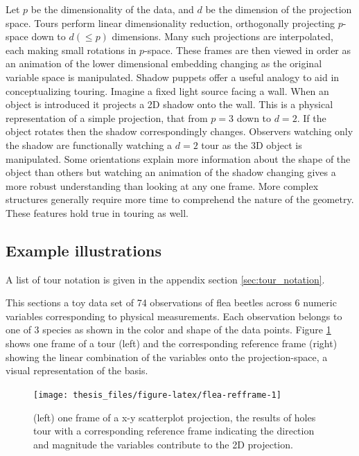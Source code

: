 \documentclass{monashthesis}
\begin{document}
Let \(p\) be the dimensionality of the data, and \(d\) be the dimension
of the projection space. Tours perform linear dimensionality reduction,
orthogonally projecting \(p\)-space down to \(d(\leq p)\) dimensions.
Many such projections are interpolated, each making small rotations in
\(p\)-space. These frames are then viewed in order as an animation of
the lower dimensional embedding changing as the original variable space
is manipulated. Shadow puppets offer a useful analogy to aid in
conceptualizing touring. Imagine a fixed light source facing a wall.
When an object is introduced it projects a 2D shadow onto the wall. This
is a physical representation of a simple projection, that from \(p=3\)
down to \(d=2\). If the object rotates then the shadow correspondingly
changes. Observers watching only the shadow are functionally watching a
\(d=2\) tour as the 3D object is manipulated. Some orientations explain
more information about the shape of the object than others but watching
an animation of the shadow changing gives a more robust understanding
than looking at any one frame. More complex structures generally require
more time to comprehend the nature of the geometry. These features hold
true in touring as well.

\subsection{Example illustrations}\label{example-illustrations}

A list of tour notation is given in the appendix section
\ref{sec:tour_notation}.

This sections a toy data set of 74 observations of flea beetles across 6
numeric variables corresponding to physical measurements. Each
observation belongs to one of 3 species as shown in the color and shape
of the data points. Figure \ref{fig:flea-refframe} shows one frame of a
tour (left) and the corresponding reference frame (right) showing the
linear combination of the variables onto the projection-space, a visual
representation of the basis.

\begin{figure}

{\centering \texttt{[image: thesis\_files/figure-latex/flea-refframe-1]} 

}

\caption{(left) one frame of a x-y scatterplot projection, the results of holes tour with a corresponding reference frame indicating the direction and magnitude the variables contribute to the 2D projection.}\label{fig:flea-refframe}
\end{figure}
\end{document}

